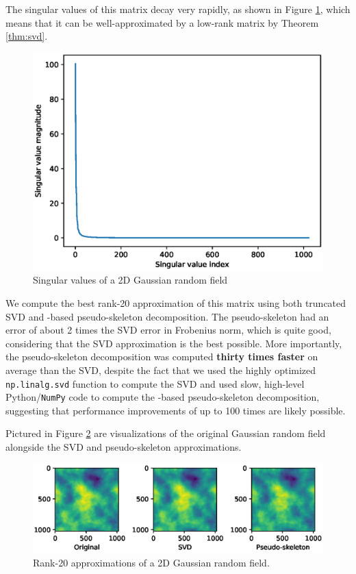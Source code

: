 \documentclass{article}
\begin{document}
	The singular values of this matrix decay very rapidly, as shown in Figure \ref{fig:singular_values}, which means that it can be well-approximated by a low-rank matrix by Theorem \ref{thm:svd}.
	\begin{figure}[h]
		\centering
		\includegraphics[width=0.6\linewidth, trim={0, 0.2cm, 0, 1.5cm}, clip]{singular_values.eps}
		\caption{Singular values of a 2D Gaussian random field}
		\label{fig:singular_values}
	\end{figure}
	
	We compute the best rank-20 approximation of this matrix using both truncated SVD and \maxvol{}-based pseudo-skeleton decomposition. The pseudo-skeleton had an error of about 2 times the SVD error in Frobenius norm, which is quite good, considering that the SVD approximation is the best possible. More importantly, the pseudo-skeleton decomposition was computed \textbf{thirty times faster} on average than the SVD, despite the fact that we used the highly optimized \texttt{np.linalg.svd} function to compute the SVD and used slow, high-level Python/\texttt{NumPy} code to compute the \maxvol{}-based pseudo-skeleton decomposition, suggesting that performance improvements of up to 100 times are likely possible.
	
	Pictured in Figure \ref{fig:reconstructions} are visualizations of the original Gaussian random field alongside the SVD and pseudo-skeleton approximations.
	\begin{figure}[h]
		\centering
		\includegraphics[width=\linewidth, trim={0, 3.25cm, 0, 4cm}, clip]{reconstructions.eps}
		\caption{Rank-20 approximations of a 2D Gaussian random field.}
		\label{fig:reconstructions}
	\end{figure}
	
\end{document}
